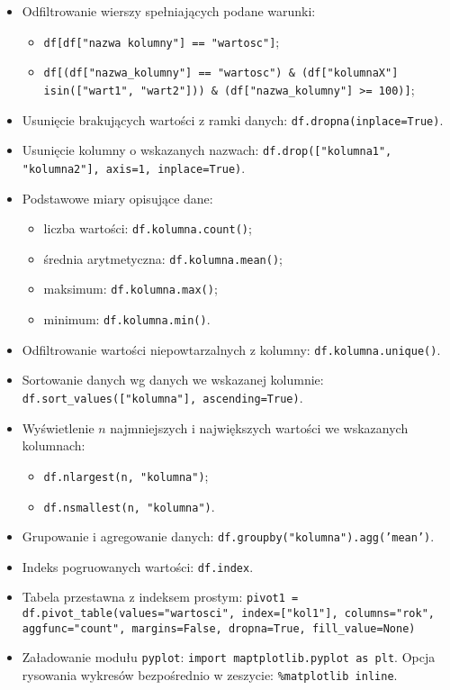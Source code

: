 \documentclass[11pt]{report}
\begin{document}
\begin{itemize}
    \item Odfiltrowanie wierszy spełniających podane warunki: 
    \begin{itemize}
        \item \texttt{df[df["{}nazwa kolumny"] == "wartosc"]};
        \item \texttt{df[(df["{}nazwa\_kolumny"] == "wartosc") \& (df["kolumnaX"] isin(["wart1", "wart2"])) \& (df["{}nazwa\_kolumny"{}] >= 100)]};
    \end{itemize}
    \item Usunięcie brakujących wartości z ramki danych: \texttt{df.dropna(inplace=True)}.
    \item Usunięcie kolumny o wskazanych nazwach: \texttt{df.drop(["kolumna1", "kolumna2"], axis=1, inplace=True)}.
    \item Podstawowe miary opisujące dane: 
    \begin{itemize}
        \item liczba wartości: \texttt{df.kolumna.count()};
        \item średnia arytmetyczna: \texttt{df.kolumna.mean()};
        \item maksimum: \texttt{df.kolumna.max()};
        \item minimum: \texttt{df.kolumna.min()}.
    \end{itemize}
    \item Odfiltrowanie wartości niepowtarzalnych z kolumny: \texttt{df.kolumna.unique()}.
    \item Sortowanie danych wg danych we wskazanej kolumnie: \texttt{df.sort\_values(["kolumna"], ascending=True)}.
    \item Wyświetlenie $n$ najmniejszych i największych wartości we wskazanych kolumnach: 
    \begin{itemize}
        \item \texttt{df.nlargest(n, "kolumna")};
        \item \texttt{df.nsmallest(n, "kolumna")}.
    \end{itemize}
    \item Grupowanie i agregowanie danych: \texttt{df.groupby("kolumna").agg('mean')}.
    \item Indeks pogruowanych wartości: \texttt{df.index}.
    \item Tabela przestawna z indeksem prostym: \texttt{pivot1 = df.pivot\_table(values="wartosci", index=["kol1"], columns="rok", aggfunc="count", margins=False, dropna=True, fill\_value=None)}
    \item Załadowanie modułu \texttt{pyplot}: \texttt{import maptplotlib.pyplot as plt}. Opcja rysowania wykresów bezpośrednio w zeszycie: \texttt{\%matplotlib inline}.

\end{itemize}
\end{document}
